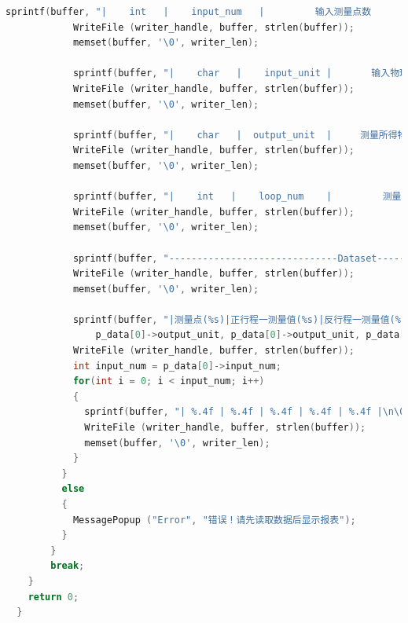 \documentclass[a4paper,12pt,twoside]{article}%
\begin{document}
\begin{lstlisting}[language=C]
            sprintf(buffer, "|    int   |    input_num   |         输入测量点数      |    %d    |\n\0", p_data[0]->input_num);
            WriteFile (writer_handle, buffer, strlen(buffer));
            memset(buffer, '\0', writer_len);
            
            sprintf(buffer, "|    char   |    input_unit |       输入物理量的单位     |    %s    |\n\0", p_data[0]->input_unit);
            WriteFile (writer_handle, buffer, strlen(buffer));
            memset(buffer, '\0', writer_len);
            
            sprintf(buffer, "|    char   |  output_unit  |     测量所得物理量的单位    |    %s    |\n\0", p_data[0]->output_unit);
            WriteFile (writer_handle, buffer, strlen(buffer));
            memset(buffer, '\0', writer_len);
            
            sprintf(buffer, "|    int   |    loop_num    |         测量的循环数       |    %d    |\n\0", p_data[0]->loop_num);
            WriteFile (writer_handle, buffer, strlen(buffer));
            memset(buffer, '\0', writer_len);
            
            sprintf(buffer, "------------------------------Dataset------------------------------\n\0");
            WriteFile (writer_handle, buffer, strlen(buffer));
            memset(buffer, '\0', writer_len);
            
            sprintf(buffer, "|测量点(%s)|正行程一测量值(%s)|反行程一测量值(%s)|正行程二测量值(%s)|反行程二测量值(%s)|\n\0", p_data[0]->input_unit, 
                p_data[0]->output_unit, p_data[0]->output_unit, p_data[0]->output_unit, p_data[0]->output_unit);
            WriteFile (writer_handle, buffer, strlen(buffer));
            int input_num = p_data[0]->input_num;
            for(int i = 0; i < input_num; i++)
            {
              sprintf(buffer, "| %.4f | %.4f | %.4f | %.4f | %.4f |\n\0", p_data[0]->input[i], p_data[0]->output[i], p_data[0]->output[i + input_num * 1], p_data[0]->output[i + input_num * 2], p_data[0]->output[i + input_num * 3]);
              WriteFile (writer_handle, buffer, strlen(buffer));
              memset(buffer, '\0', writer_len);
            }
          }
          else
          {
            MessagePopup ("Error", "错误！请先读取数据后显示报表");
          }
        }
        break;
    }
    return 0;
  }
  

\end{lstlisting}
\end{document}
